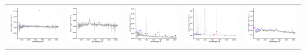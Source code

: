 \begin{center}
\begin{longtable}{l l l l l }
    \includegraphics[width=0.2\linewidth, clip]{Figs/Figs-sdss/spec-4037-55631-0460-SPLUS-n02s44-029163.pdf} & \includegraphics[width=0.2\linewidth, clip]{Figs/Figs-sdss/spec-4220-55447-0004-STRIPE82-0013-055791.pdf} & \includegraphics[width=0.2\linewidth, clip]{Figs/Figs-sdss/spec-4748-55631-0047-SPLUS-n02n25-025655.pdf} & \includegraphics[width=0.2\linewidth, clip]{Figs/Figs-sdss/spec-7822-57041-0278-STRIPE82-0061-047759.pdf} & \includegraphics[width=0.2\linewidth, clip]{Figs/Figs-sdss/spec-9147-58038-0401-SPLUS-s02s08-004413.pdf} \\

\end{longtable}
\end{center}

